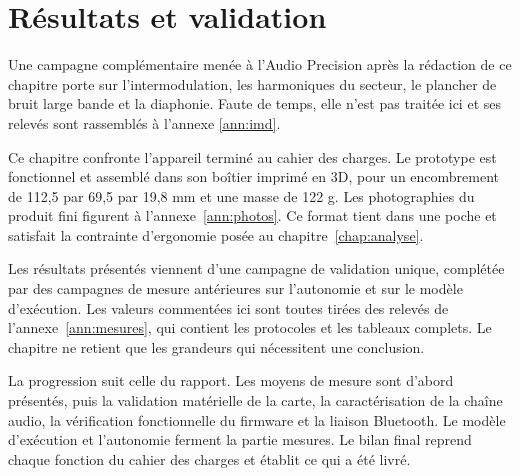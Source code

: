 \chapter{Résultats et validation}
\label{chap:results}

Une campagne complémentaire menée à l'Audio Precision après la rédaction de ce chapitre porte sur l'intermodulation, les harmoniques du secteur, le plancher de bruit large bande et la diaphonie. Faute de temps, elle n'est pas traitée ici et ses relevés sont rassemblés à l'annexe \ref{ann:imd}.

Ce chapitre confronte l'appareil terminé au cahier des charges. Le prototype est fonctionnel et assemblé dans son boîtier imprimé en 3D, pour un encombrement de 112,5 par 69,5 par 19,8 mm et une masse de 122 g. Les photographies du produit fini figurent à l'annexe~\ref{ann:photos}. Ce format tient dans une poche et satisfait la contrainte d'ergonomie posée au chapitre~\ref{chap:analyse}.

Les résultats présentés viennent d'une campagne de validation unique, complétée par des campagnes de mesure antérieures sur l'autonomie et sur le modèle d'exécution. Les valeurs commentées ici sont toutes tirées des relevés de l'annexe~\ref{ann:mesures}, qui contient les protocoles et les tableaux complets. Le chapitre ne retient que les grandeurs qui nécessitent une conclusion.

La progression suit celle du rapport. Les moyens de mesure sont d'abord présentés, puis la validation matérielle de la carte, la caractérisation de la chaîne audio, la vérification fonctionnelle du firmware et la liaison Bluetooth. Le modèle d'exécution et l'autonomie ferment la partie mesures. Le bilan final reprend chaque fonction du cahier des charges et établit ce qui a été livré.